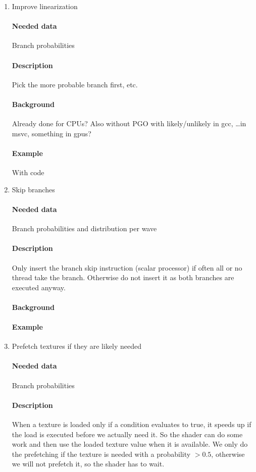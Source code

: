 \begin{enumerate}
	\item Improve linearization
	\paragraph{Needed data} Branch probabilities
	\paragraph{Description} Pick the more probable branch first, etc.
	\paragraph{Background} Already done for CPUs? Also without PGO with likely/unlikely in gcc, \dots in msvc, something in gpus?
	\paragraph{Example} With code
	
	\item Skip branches
	\paragraph{Needed data} Branch probabilities and distribution per wave
	\paragraph{Description} Only insert the branch skip instruction (scalar processor) if often all or no thread take the branch. Otherwise do not insert it as both branches are executed anyway.
	\paragraph{Background}
	\paragraph{Example}
	
	\item Prefetch textures if they are likely needed
	\paragraph{Needed data} Branch probabilities
	\paragraph{Description} When a texture is loaded only if a condition evaluates to true, it speeds up if the load is executed before we actually need it. So the shader can do some work and then use the loaded texture value when it is available. We only do the prefetching if the texture is needed with a probability $> 0.5$, otherwise we will not prefetch it, so the shader has to wait.

\end{enumerate}
